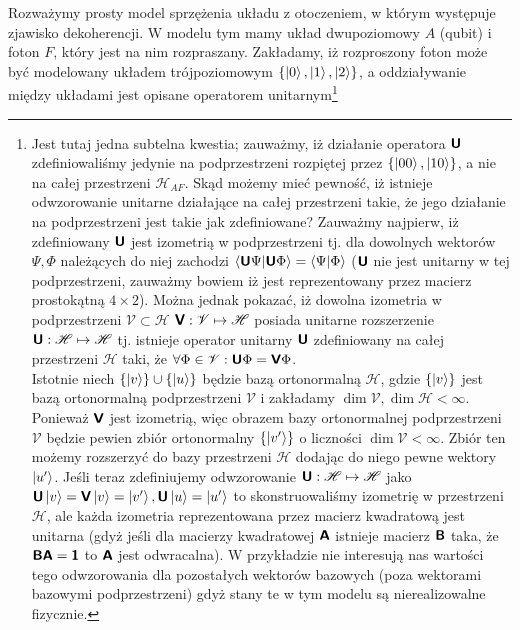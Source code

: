 \documentclass{myclass}
\begin{document}
Rozważymy prosty model sprzężenia układu z otoczeniem, w którym występuje zjawisko dekoherencji. W
modelu tym mamy układ dwupoziomowy \(A\) (qubit) i foton \(F\), który jest na nim rozpraszany.
Zakładamy, iż rozproszony foton może być modelowany układem trójpoziomowym \(\{\ket{0}, \ket{1},
\ket{2}\}\), a oddziaływanie między układami jest opisane operatorem unitarnym\footnote{Jest tutaj
jedna subtelna kwestia; zauważmy, iż działanie operatora \(\boldsymbol{\mathsf{U}}\) zdefiniowaliśmy jedynie na
podprzestrzeni rozpiętej przez \(\{\ket{00}, \ket{10}\}\), a nie na całej przestrzeni
\(\mathscr{H}_{AF}\). Skąd możemy mieć pewność, iż istnieje odwzorowanie unitarne działające na
całej przestrzeni takie, że jego działanie na podprzestrzeni jest takie jak zdefiniowane? Zauważmy
najpierw, iż zdefiniowany \(\boldsymbol{\mathsf{U}}\) jest izometrią w podprzestrzeni tj. dla dowolnych wektorów
\(\Psi, \Phi\) należących do niej zachodzi \(\braket{\boldsymbol{\mathsf{U}}\Psi}{\boldsymbol{\mathsf{U}}\Phi} =
\braket{\Psi}{\Phi}\) (\(\boldsymbol{\mathsf{U}}\) nie jest unitarny w tej podprzestrzeni, zauważmy bowiem iż jest
reprezentowany przez macierz prostokątną \(4 \times 2\)). Można jednak pokazać, iż dowolna izometria
w podprzestrzeni \(\mathscr{V} \subset \mathscr{H}\) \(\boldsymbol{\mathsf{V}}:\mathscr{V}\mapsto\mathscr{H}\)
posiada unitarne rozszerzenie \(\boldsymbol{\mathsf{U}}:\mathscr{H}\mapsto\mathscr{H}\) tj. istnieje operator
unitarny \(\boldsymbol{\mathsf{U}}\) zdefiniowany na całej przestrzeni \(\mathscr{H}\) taki, że \(\forall
\Phi\in\mathscr{V}: \boldsymbol{\mathsf{U}}\Phi = \boldsymbol{\mathsf{V}}\Phi\).\\ Istotnie niech \(\{\ket{v}\}\cup\{\ket{u}\}\)
będzie bazą ortonormalną \(\mathscr{H}\), gdzie \(\{\ket{v}\}\) jest bazą ortonormalną
podprzestrzeni \(\mathscr{V}\) i zakładamy \(\dim\mathscr{V}, \dim\mathscr{H} < \infty\). Ponieważ
\(\boldsymbol{\mathsf{V}}\) jest izometrią, więc obrazem bazy ortonormalnej podprzestrzeni \(\mathscr{V}\) będzie
pewien zbiór ortonormalny \(\{\ket{v'}\}\) o liczności \(\dim\mathscr{V} < \infty\). Zbiór ten
możemy rozszerzyć do bazy przestrzeni \(\mathscr{H}\) dodając do niego pewne wektory \(\ket{u'}\).
Jeśli teraz zdefiniujemy odwzorowanie \(\boldsymbol{\mathsf{U}}:\mathscr{H}\mapsto\mathscr{H}\) jako
\(\boldsymbol{\mathsf{U}}\ket{v} = \boldsymbol{\mathsf{V}}\ket{v} = \ket{v'}, \boldsymbol{\mathsf{U}}\ket{u} = \ket{u'}\) to skonstruowaliśmy
izometrię w przestrzeni \(\mathscr{H}\), ale każda izometria reprezentowana przez macierz kwadratową
jest unitarna (gdyż jeśli dla macierzy kwadratowej \(\boldsymbol{\mathsf{A}}\) istnieje macierz \(\boldsymbol{\mathsf{B}}\) taka,
że \(\boldsymbol{\mathsf{BA}} = \boldsymbol{\mathsf{1}}\) to \(\boldsymbol{\mathsf{A}}\) jest odwracalna). W przykładzie nie interesują nas
wartości tego odwzorowania dla pozostałych wektorów bazowych (poza wektorami bazowymi
podprzestrzeni) gdyż stany te w tym modelu są nierealizowalne fizycznie.}
\end{document}
